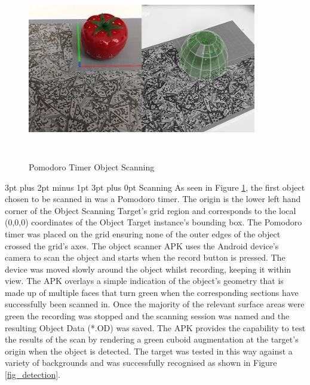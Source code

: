 \documentclass[12pt,a4paper,oneside]{article}
\makeatletter
\renewcommand\paragraph{\@startsection {paragraph}{1}{0mm} %
	                           {3pt plus 2pt minus 1pt} %
	                           {3pt plus 0pt} %
	                           {\normalfont}}
\makeatother
\begin{document}
\begin{figure}[!h]
	\centering
	\includegraphics[width=10cm,height=8cm,keepaspectratio]{images/pomo}
	\caption{Pomodoro Timer Object Scanning}
	\label{fig_pomo}
\end{figure}


\paragraph{Scanning}
As seen in Figure \ref{fig_pomo}, the first object chosen to be scanned in was a Pomodoro timer. The origin is the lower left hand corner of the Object Scanning Target's grid region and corresponds to the local (0,0,0) coordinates of the Object Target instance's bounding box. The Pomodoro timer was placed on the grid ensuring none of the outer edges of the object crossed the grid's axes. The object scanner APK uses the Android device's camera to scan the object and starts when the record button is pressed. The device was moved slowly around the object whilst recording, keeping it within view. The APK overlays a simple indication of the object's geometry that is made up of multiple faces that turn green when the corresponding sections have successfully been scanned in. Once the majority of the relevant surface areas were green the recording was stopped and the scanning session was named and the resulting Object Data (*.OD) was saved. The APK provides the capability to test the results of the scan by rendering a green cuboid augmentation at the target's origin when the object is detected. The target was tested in this way against a variety of backgrounds and was successfully recognised as shown in Figure \ref{fig_detection}. 
\end{document}

